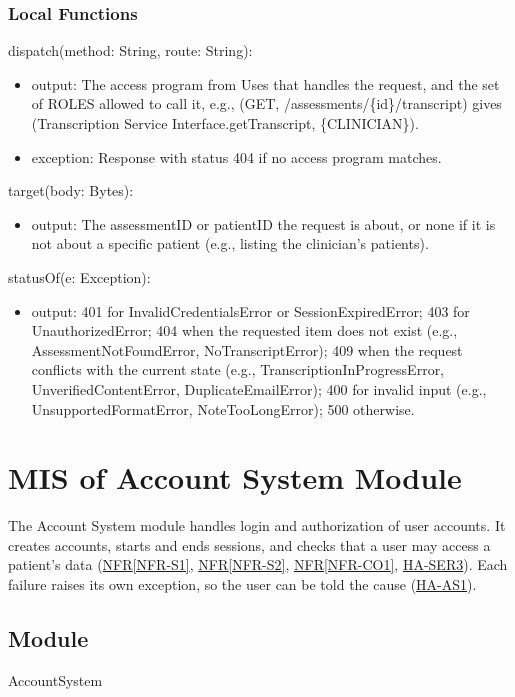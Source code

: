 \documentclass[12pt, titlepage]{article}
\newcommand{\srsref}[2]{\href{https://github.com/Nour-Fawaz/MacaBoca/blob/main/pdfs/SRS/SRS.pdf}{#1\ref*{#2}}}
\newcommand{\hazref}[1]{\href{https://github.com/Nour-Fawaz/MacaBoca/blob/main/pdfs/HazardAnalysis/HazardAnalysis.pdf}{#1}}
\begin{document}
\subsubsection{Local Functions}

\noindent dispatch(method: String, route: String):
\begin{itemize}
\item output: The access program from Uses that handles the request, and the
  set of ROLES allowed to call it, e.g., (GET, /assessments/\{id\}/transcript)
  gives (Transcription Service Interface.getTranscript, \{CLINICIAN\}).
\item exception: Response with status 404 if no access program matches.
\end{itemize}

\noindent target(body: Bytes):
\begin{itemize}
\item output: The assessmentID or patientID the request is about, or none if
  it is not about a specific patient (e.g., listing the clinician's patients).
\end{itemize}

\noindent statusOf(e: Exception):
\begin{itemize}
\item output: 401 for InvalidCredentialsError or SessionExpiredError; 
  403 for UnauthorizedError; 404 when the requested item does not exist
  (e.g., AssessmentNotFoundError, NoTranscriptError); 409 when the request
  conflicts with the current state (e.g., TranscriptionInProgressError,
  UnverifiedContentError, DuplicateEmailError); 400 for invalid input (e.g.,
  UnsupportedFormatError, NoteTooLongError); 500 otherwise.
\end{itemize}

\newpage

\section{MIS of Account System Module}\label{AccSys}
The Account System module handles login and authorization of user accounts.
It creates accounts, starts and ends sessions, and checks that a user may
access a patient's data (\srsref{NFR}{NFR-S1}, \srsref{NFR}{NFR-S2},
\srsref{NFR}{NFR-CO1}, \hazref{HA-SER3}). Each failure raises its own
exception, so the user can be told the cause (\hazref{HA-AS1}).

\subsection{Module}
AccountSystem
\end{document}
